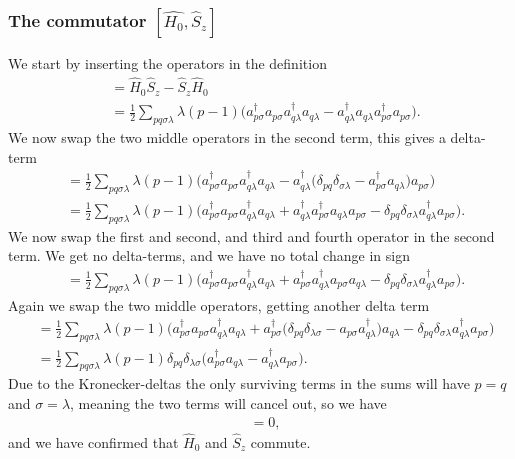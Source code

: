 \documentclass[a4paper, 11pt, notitlepage, english]{article}
\newcommand{\op}[1]{\hat{#1}}
\begin{document}
\subsubsection*{The commutator $[\op{H_0}, \op{S}_z]$}
We start by inserting the operators in the definition
\begin{align*}
[\op{H}_0, \op{S}_z] &= \op{H}_0\op{S}_z - \op{S}_z\op{H}_0 \\
&= \frac{1}{2}\sum_{pq \sigma\lambda} \lambda(p-1)\bigg(a_{p\sigma}^\dagger a_{p\sigma}  a_{q\lambda}^\dagger a_{q\lambda}
-   a_{q\lambda}^\dagger a_{q\lambda}  a_{p\sigma}^\dagger a_{p\sigma}\bigg).
\end{align*}
We now swap the two middle operators in the second term, this gives a delta-term
\begin{align*}
[\op{H}_0, \op{S}_z] &= \frac{1}{2}\sum_{pq \sigma\lambda} \lambda(p-1)\bigg(a_{p\sigma}^\dagger a_{p\sigma}  a_{q\lambda}^\dagger a_{q\lambda} 
-   a_{q\lambda}^\dagger \big(\delta_{pq}\delta_{\sigma\lambda} - a_{p\sigma}^\dagger a_{q\lambda} \big) a_{p\sigma}\bigg) \\
&= \frac{1}{2}\sum_{pq \sigma\lambda} \lambda(p-1)\bigg(a_{p\sigma}^\dagger a_{p\sigma}  a_{q\lambda}^\dagger a_{q\lambda}
+   a_{q\lambda}^\dagger a_{p\sigma}^\dagger a_{q\lambda} a_{p\sigma} - \delta_{pq}\delta_{\sigma\lambda}a_{q\lambda}^\dagger a_{p\sigma}
\bigg).
\end{align*}
We now swap the first and second, and third and fourth operator in the second term. We get no delta-terms, and we have no total change in sign
\begin{align*}
[\op{H}_0, \op{S}_z]  &= \frac{1}{2}\sum_{pq \sigma\lambda} \lambda(p-1)\bigg(a_{p\sigma}^\dagger a_{p\sigma}  a_{q\lambda}^\dagger a_{q\lambda}
+   a_{p\sigma}^\dagger  a_{q\lambda}^\dagger  a_{p\sigma} a_{q\lambda} - \delta_{pq}\delta_{\sigma\lambda}a_{q\lambda}^\dagger a_{p\sigma}
\bigg).
\end{align*}
Again we swap the two middle operators, getting another delta term
\begin{align*}
 [\op{H}_0, \op{S}_z]  &= \frac{1}{2}\sum_{pq \sigma\lambda} \lambda(p-1)\bigg(a_{p\sigma}^\dagger a_{p\sigma}  a_{q\lambda}^\dagger a_{q\lambda}
+  a_{p\sigma}^\dagger  \big(\delta_{pq}\delta_{\lambda\sigma} - a_{p\sigma} a_{q\lambda}^\dagger  \big) a_{q\lambda} - \delta_{pq}\delta_{\sigma\lambda}a_{q\lambda}^\dagger a_{p\sigma}
\bigg) \\
&= \frac{1}{2}\sum_{pq \sigma\lambda} \lambda(p-1) \delta_{pq}\delta_{\lambda\sigma}\big(a_{p\sigma}^\dagger a_{q\lambda} - a_{q\lambda}^\dagger a_{p\sigma}
\big).
\end{align*}
Due to the Kronecker-deltas the only surviving terms in the sums will have $p=q$ and $\sigma=\lambda$, meaning the two terms will cancel out, so we have
\begin{align*}
 [\op{H}_0, \op{S}_z] &= 0,
\end{align*}
and we have confirmed that $\op{H}_0$ and $\op{S}_z$ commute.
\end{document}
